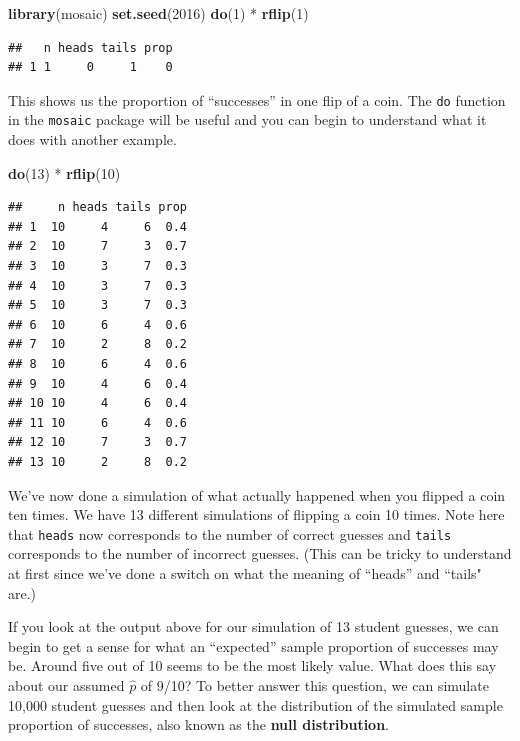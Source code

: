 \documentclass[]{tufte-book}
\newenvironment{Shaded}{\begin{snugshade}}{\end{snugshade}}
\newcommand{\KeywordTok}[1]{\textcolor[rgb]{0.13,0.29,0.53}{\textbf{{#1}}}}
\newcommand{\DecValTok}[1]{\textcolor[rgb]{0.00,0.00,0.81}{{#1}}}
\newcommand{\StringTok}[1]{\textcolor[rgb]{0.31,0.60,0.02}{{#1}}}
\newcommand{\NormalTok}[1]{{#1}}
\begin{document}
\begin{Shaded}
\begin{Highlighting}[]
\KeywordTok{library}\NormalTok{(mosaic)}
\KeywordTok{set.seed}\NormalTok{(}\DecValTok{2016}\NormalTok{)}
\KeywordTok{do}\NormalTok{(}\DecValTok{1}\NormalTok{) *}\StringTok{ }\KeywordTok{rflip}\NormalTok{(}\DecValTok{1}\NormalTok{)}
\end{Highlighting}
\end{Shaded}

\begin{verbatim}
##   n heads tails prop
## 1 1     0     1    0
\end{verbatim}

This shows us the proportion of ``successes'' in one flip of a coin. The
\texttt{do} function in the \texttt{mosaic} package will be useful and
you can begin to understand what it does with another example.

\begin{Shaded}
\begin{Highlighting}[]
\KeywordTok{do}\NormalTok{(}\DecValTok{13}\NormalTok{) *}\StringTok{ }\KeywordTok{rflip}\NormalTok{(}\DecValTok{10}\NormalTok{)}
\end{Highlighting}
\end{Shaded}

\begin{verbatim}
##     n heads tails prop
## 1  10     4     6  0.4
## 2  10     7     3  0.7
## 3  10     3     7  0.3
## 4  10     3     7  0.3
## 5  10     3     7  0.3
## 6  10     6     4  0.6
## 7  10     2     8  0.2
## 8  10     6     4  0.6
## 9  10     4     6  0.4
## 10 10     4     6  0.4
## 11 10     6     4  0.6
## 12 10     7     3  0.7
## 13 10     2     8  0.2
\end{verbatim}

We've now done a simulation of what actually happened when you flipped a
coin ten times. We have 13 different simulations of flipping a coin 10
times. Note here that \texttt{heads} now corresponds to the number of
correct guesses and \texttt{tails} corresponds to the number of
incorrect guesses. (This can be tricky to understand at first since
we've done a switch on what the meaning of ``heads'' and ``tails" are.)

If you look at the output above for our simulation of 13 student
guesses, we can begin to get a sense for what an ``expected'' sample
proportion of successes may be. Around five out of 10 seems to be the
most likely value. What does this say about our assumed \(\hat{p}\) of
9/10? To better answer this question, we can simulate 10,000 student
guesses and then look at the distribution of the simulated sample
proportion of successes, also known as the \textbf{null distribution}.
\end{document}
